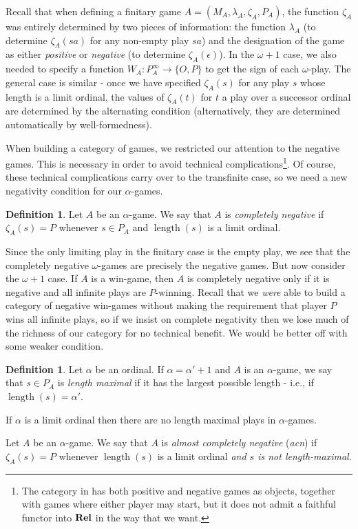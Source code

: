 \documentclass[11pt]{article} %
\theoremstyle{plain} %
\theoremstyle{definition} %
\newtheorem{definition}[theorem]{Definition}
\theoremstyle{note}
\theoremstyle{exercisestyle}
\newcommand{\catname}[1]{{\normalfont\textbf{#1}}}
\newcommand{\Rel}{\catname{Rel}}
\newcommand*\from{\colon}
\newcommand{\cmap}[3]{#1\from{}#2\to{}#3}
\newcommand{\OP}{\{O,P\}}
\newcommand{\emptyplay}{\epsilon}
\DeclareMathOperator{\length}{length}
\begin{document}
Recall that when defining a finitary game $A=(M_A,\lambda_A,\zeta_A,P_A)$, the function $\zeta_A$ was entirely determined by two pieces of information: the function $\lambda_A$ (to determine $\zeta_A(sa)$ for any non-empty play $sa$) and the designation of the game as either \emph{positive} or \emph{negative} (to determine $\zeta_A(\emptyplay)$).  In the $\omega+1$ case, we also needed to specify a function $\cmap{W_A}{P_A^\infty}{\OP}$ to get the sign of each $\omega$-play.  The general case is similar - once we have specified $\zeta_A(s)$ for any play $s$ whose length is a limit ordinal, the values of $\zeta_A(t)$ for $t$ a play over a successor ordinal are determined by the alternating condition (alternatively, they are determined automatically by well-formedness).  

When building a category of games, we restricted our attention to the negative games.  This is necessary in order to avoid technical complications\footnote{The category in \cite{abramskyjagadeesangames} has both positive and negative games as objects, together with games where either player may start, but it does not admit a faithful functor into $\Rel$ in the way that we want.}.  Of course, these technical complications carry over to the transfinite case, so we need a new negativity condition for our $\alpha$-games.

\begin{definition}
  Let $A$ be an $\alpha$-game.  We say that $A$ is \emph{completely negative} if $\zeta_A(s)=P$ whenever $s\in P_A$ and $\length(s)$ is a limit ordinal.
\end{definition}

Since the only limiting play in the finitary case is the empty play, we see that the completely negative $\omega$-games are precisely the negative games.  But now consider the $\omega+1$ case.  If $A$ is a win-game, then $A$ is completely negative only if it is negative and all infinite plays are $P$-winning.  Recall that we \emph{were} able to build a category of negative win-games without making the requirement that player $P$ wins all infinite plays, so if we insist on complete negativity then we lose much of the richness of our category for no technical benefit.  We would be better off with some weaker condition.

\begin{definition}
  Let $\alpha$ be an ordinal.  If $\alpha=\alpha'+1$ and $A$ is an $\alpha$-game, we say that $s\in P_A$ is \emph{length maximal} if it has the largest possible length - i.e., if $\length(s)=\alpha'$.  

  If $\alpha$ is a limit ordinal then there are no length maximal plays in $\alpha$-games.

  Let $A$ be an $\alpha$-game.  We say that $A$ is \emph{almost completely negative} (\emph{acn}) if $\zeta_A(s)=P$ whenever $\length(s)$ is a limit ordinal \emph{and $s$ is not length-maximal}.
\end{definition}
\end{document}
